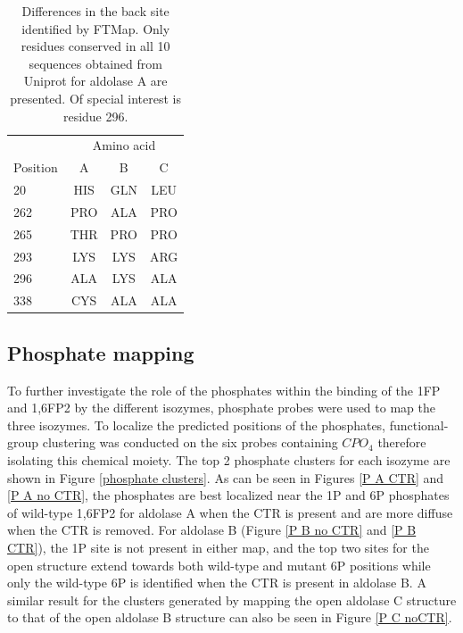 \documentclass[11pt,a4paper]{article}
\begin{document}
\begin{table}

\begin{center}
\begin{tabular}{l|c|c|c|}
 & \multicolumn{3}{c}{Amino acid}\\
Position & A & B & C \\
\hline
20  & HIS & GLN & LEU\\
262 & PRO & ALA & PRO\\
265 & THR & PRO & PRO\\
293 & LYS & LYS & ARG\\
296 & ALA & LYS & ALA\\
338 & CYS & ALA & ALA
\end{tabular}
\caption{  Differences in the back site identified by FTMap.  Only residues conserved in all 10 sequences obtained from
        Uniprot for aldolase A are presented.  Of special interest is residue 296.
}\label{tab:back}
\end{center}
\end{table}

\subsection{Phosphate mapping}
	To further investigate the role of the phosphates within the binding of 
	the 1FP and 1,6FP2 by the different isozymes, phosphate probes were used to map the three isozymes.
	To localize the predicted positions of the phosphates, functional-group clustering was conducted on the six probes containing $CPO_4$ therefore
	isolating this chemical moiety.  The top
	2 phosphate clusters for each isozyme are shown in Figure \ref{phosphate clusters}.  As can be seen in Figures \ref{P A CTR} and 
	\ref{P A no CTR}, the phosphates are best 
	localized near the 1P and 6P phosphates of wild-type 1,6FP2 for aldolase A when the CTR is present and are more diffuse when the CTR is removed.  For aldolase B 
	(Figure \ref{P B no CTR} and \ref{P B CTR}), the 1P site is not present in either map, and the top two sites for the open structure extend towards both
	wild-type and mutant 6P positions while only the wild-type 6P is identified when the CTR is present in aldolase B.  A similar result for 
	the clusters generated by mapping the open aldolase C structure to that of the open aldolase B structure can also be seen in  
	Figure \ref{P C noCTR}.   
\end{document}
